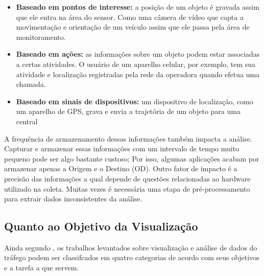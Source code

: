 \begin{itemize}
  \item \textbf{Baseado em pontos de interesse:} a posição de um objeto é
gravada assim que ele entra na área do sensor. Como uma câmera de vídeo que
capta a movimentação e orientação de um veículo assim que ele passa pela área de
monitoramento.

  \item \textbf{Baseado em ações:} as informações sobre um objeto podem estar
associadas a certas atividades. O usuário de um aparelho celular, por exemplo,
tem sua atividade e localização registradas pela rede da operadora
quando efetua uma chamada.

\item \textbf{Baseado em sinais de dispositivos:} um dispositivo de localização,
como um aparelho de GPS, grava e envia a trajetória de um objeto para uma central
\end{itemize}

A frequência de armazenamento dessas informações também impacta a análise.
Capturar e armazenar essas informações com um intervalo de tempo muito pequeno
pode ser algo bastante custoso; Por isso, algumas aplicações acabam por
armazenar apenas a Origem e o Destino (OD). Outro fator de impacto é a precisão
das informações a qual depende de questões relacionadas ao hardware utilizado na
coleta. Muitas vezes é necessária uma etapa de pré-processamento para extrair
dados inconsistentes da análise.

\subsection{Quanto ao Objetivo da Visualização}

Ainda segundo \citet{Chen2015}, os trabalhos levantados sobre visualização e análise
de dados do tráfego podem ser classifcados em quatro categorias de
acordo com seus objetivos e a tarefa a que servem.

